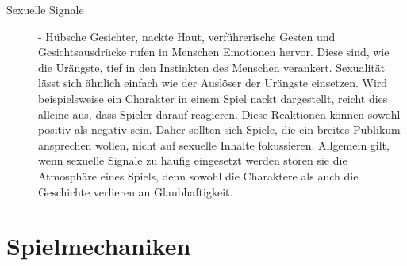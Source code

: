 \begin{description}
\item[Sexuelle Signale] - Hübsche Gesichter, nackte Haut, verführerische Gesten und Gesichtsausdrücke rufen in Menschen Emotionen hervor. Diese sind, wie die Urängste, tief in den Instinkten des Menschen verankert. Sexualität lässt sich ähnlich einfach wie der Auslöser der Urängste einsetzen. Wird beispielsweise ein Charakter in einem Spiel nackt dargestellt, reicht dies alleine aus, dass Spieler darauf reagieren. Diese Reaktionen können sowohl positiv als negativ sein. Daher sollten sich Spiele, die ein breites Publikum ansprechen wollen, nicht auf sexuelle Inhalte fokussieren. Allgemein gilt, wenn sexuelle Signale zu häufig eingesetzt werden stören sie die Atmosphäre eines Spiels, denn sowohl die Charaktere als auch die Geschichte verlieren an Glaubhaftigkeit. \cite[S. 29f.]{Adams:1515529}
%



\end{description}
%
%






\section{Spielmechaniken}
\label{sec:basis_spielmechaniken}

